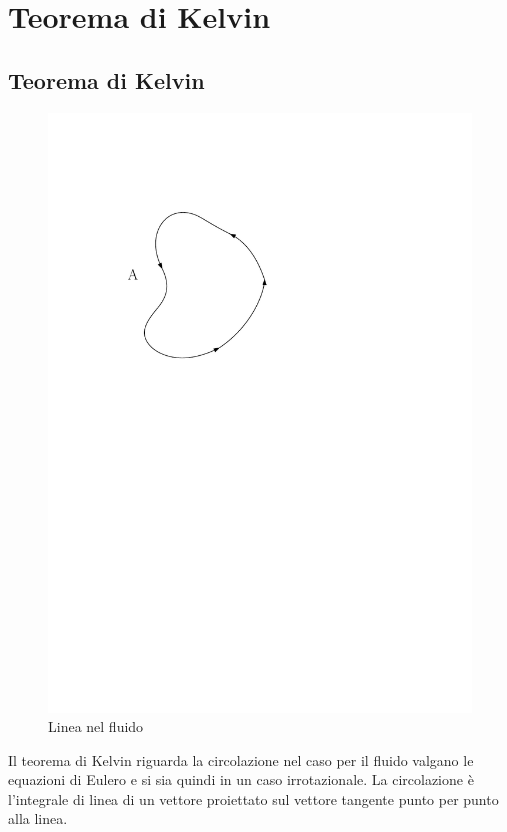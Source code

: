%
\section{Teorema di Kelvin}
\subsection{Teorema di Kelvin}
	\begin{figure}[ht]
		\includegraphics[scale=0.7]{./7.2 Teorema di Kelvin/7.2-1}
		\centering
		\caption{Linea nel fluido}
	\end{figure}
%
Il teorema di Kelvin riguarda la circolazione nel caso per il fluido valgano le equazioni di Eulero e si sia quindi in un caso irrotazionale.
La circolazione è l'integrale di linea di un vettore proiettato sul vettore tangente punto per punto alla linea.

